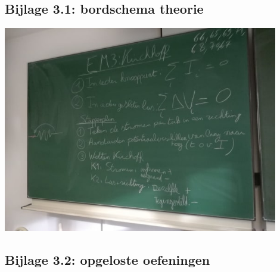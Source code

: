 \subsection*{Bijlage 3.1: bordschema theorie}
\begin{center}
	\includegraphics[width=0.9\textwidth]{Bord3}
\end{center}
\newpage
\subsection*{Bijlage 3.2: opgeloste oefeningen}




